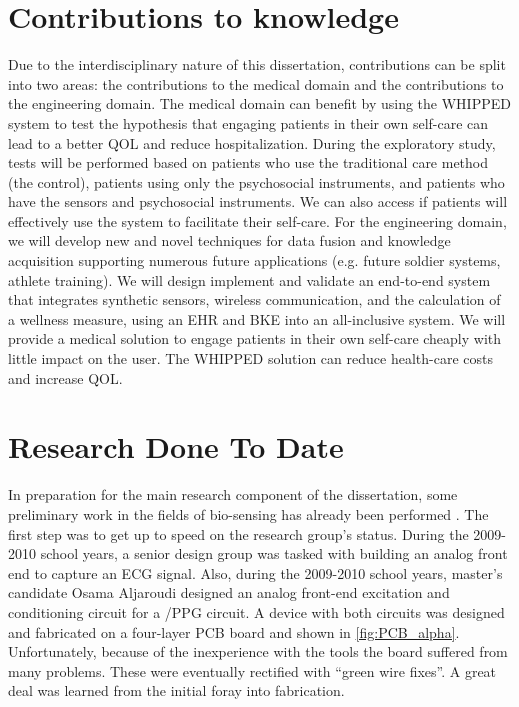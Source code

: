 \section{Contributions to knowledge}
\label{sec:ContributionsToKnowledge}
Due to the interdisciplinary nature of this dissertation, contributions can be split into two areas: the contributions to the medical domain and the contributions to the engineering domain. The medical domain can benefit by using the WHIPPED system to test the hypothesis that engaging patients in their own self-care can lead to a better QOL and reduce hospitalization. During the exploratory study, tests will be performed based on patients who use the traditional care method (the control), patients using only the psychosocial instruments, and patients who have the sensors and psychosocial instruments. We can also access if patients will effectively use the system to facilitate their self-care.
For the engineering domain, we will develop new and novel techniques for data fusion and knowledge acquisition supporting numerous future applications (e.g. future soldier systems, athlete training). We will design implement and validate an end-to-end system that integrates synthetic sensors, wireless communication, and the calculation of a wellness measure, using an EHR and BKE into an all-inclusive system. We will provide a medical solution to engage patients in their own self-care cheaply with little impact on the user. The WHIPPED solution can reduce health-care costs and increase QOL. 

\section{Research Done To Date}
\label{sec:ResearchDoneToDate}
In preparation for the main research component of the dissertation, some preliminary work in the fields of bio-sensing has already been performed . The first step was to get up to speed on the research group's status. During the 2009-2010 school years, a senior design group was tasked with building an analog front end to capture an ECG signal. Also, during the 2009-2010 school years, master's candidate Osama Aljaroudi designed an analog front-end excitation and conditioning circuit for a /PPG circuit. A device with both circuits was designed and fabricated on a four-layer PCB board and shown in \cref{fig:PCB_alpha}. Unfortunately, because of the inexperience with the tools the board suffered from many problems. These were eventually rectified with “green wire fixes”. A great deal was learned from the initial foray into fabrication.

